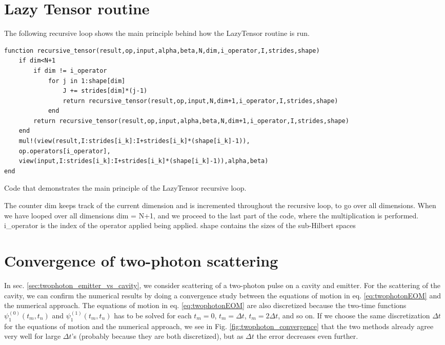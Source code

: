 \documentclass[10pt,oneside,a4paper,english]{report}
\newcommand{\code}[1]{{\fontfamily{pcr}\selectfont #1}}
\begin{document}
\begin{appendices}
\section{Lazy Tensor routine \label{app:lazytensor}}
The following recursive loop shows the main principle behind how the LazyTensor routine is run. 
\begin{listing}[H]
\begin{verbatim}
function recursive_tensor(result,op,input,alpha,beta,N,dim,i_operator,I,strides,shape)
    if dim<N+1
        if dim != i_operator
            for j in 1:shape[dim]
                J += strides[dim]*(j-1)
                return recursive_tensor(result,op,input,N,dim+1,i_operator,I,strides,shape)
            end
        return recursive_tensor(result,op,input,alpha,beta,N,dim+1,i_operator,I,strides,shape)
    end
    mul!(view(result,I:strides[i_k]:I+strides[i_k]*(shape[i_k]-1)),
    op.operators[i_operator],
    view(input,I:strides[i_k]:I+strides[i_k]*(shape[i_k]-1)),alpha,beta)
end 
\end{verbatim}
\caption{Code that demonstrates the main principle of the LazyTensor recursive loop. }
\label{ls:lazy_routine}
\end{listing}
The counter \code{dim} keeps track of the current dimension and is incremented throughout the recursive loop, to go over all dimensions. When we have looped over all dimensions \code{dim = N+1}, and we proceed to the last part of the code, where the multiplication is performed. \code{i\_operator} is the index of the operator applied being applied. \code{shape} contains the sizes of the sub-Hilbert spaces

\section{Convergence of two-photon scattering \label{app:twophoton_convergence}}
In sec. \ref{sec:twophoton_emitter_vs_cavity}, we consider scattering of a two-photon pulse on a cavity and emitter. For the scattering of the cavity, we can confirm the numerical results by doing a convergence study between the equations of motion in eq. \eqref{eq:twophotonEOM} and the numerical approach. The equations of motion in eq. \eqref{eq:twophotonEOM} are also discretized because the two-time functions $\psi_1^{(0)}(t_m,t_n)$ and $\psi_1^{(1)}(t_m,t_n)$ has to be solved for each $t_m = 0$, $t_m = \Delta t$, $t_m = 2\Delta t$, and so on. If we choose the same discretization $\Delta t$ for the equations of motion and the numerical approach, we see in Fig. \ref{fig:twophoton_convergence} that the two methods already agree very well for large $\Delta t$'s (probably because they are both discretized), but as $\Delta t$ the error decreases even further.


\end{appendices}
\end{document}

